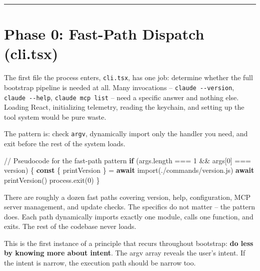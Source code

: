 \documentclass[
  english,
  11pt,
  letterpaper,
]{book}
\newenvironment{Shaded}{\begin{snugshade}}{\end{snugshade}}
\newcommand{\AttributeTok}[1]{\textcolor[rgb]{0.40,0.45,0.13}{#1}}
\newcommand{\BuiltInTok}[1]{\textcolor[rgb]{0.00,0.23,0.31}{#1}}
\newcommand{\CommentTok}[1]{\textcolor[rgb]{0.37,0.37,0.37}{#1}}
\newcommand{\ControlFlowTok}[1]{\textcolor[rgb]{0.00,0.23,0.31}{\textbf{#1}}}
\newcommand{\DecValTok}[1]{\textcolor[rgb]{0.68,0.00,0.00}{#1}}
\newcommand{\FunctionTok}[1]{\textcolor[rgb]{0.28,0.35,0.67}{#1}}
\newcommand{\ImportTok}[1]{\textcolor[rgb]{0.00,0.46,0.62}{#1}}
\newcommand{\KeywordTok}[1]{\textcolor[rgb]{0.00,0.23,0.31}{\textbf{#1}}}
\newcommand{\NormalTok}[1]{\textcolor[rgb]{0.00,0.23,0.31}{#1}}
\newcommand{\OperatorTok}[1]{\textcolor[rgb]{0.37,0.37,0.37}{#1}}
\newcommand{\StringTok}[1]{\textcolor[rgb]{0.13,0.47,0.30}{#1}}
\begin{document}
\begin{center}\rule{0.5\linewidth}{0.5pt}\end{center}

\section{Phase 0: Fast-Path Dispatch
(cli.tsx)}\label{phase-0-fast-path-dispatch-cli.tsx}

The first file the process enters, \texttt{cli.tsx}, has one job:
determine whether the full bootstrap pipeline is needed at all. Many
invocations -- \texttt{claude\ -\/-version}, \texttt{claude\ -\/-help},
\texttt{claude\ mcp\ list} -- need a specific answer and nothing else.
Loading React, initializing telemetry, reading the keychain, and setting
up the tool system would be pure waste.

The pattern is: check \texttt{argv}, dynamically import only the handler
you need, and exit before the rest of the system loads.

\begin{Shaded}
\begin{Highlighting}[]
\CommentTok{// Pseudocode for the fast{-}path pattern}
\ControlFlowTok{if}\NormalTok{ (args}\OperatorTok{.}\AttributeTok{length} \OperatorTok{===} \DecValTok{1} \OperatorTok{\&\&}\NormalTok{ args[}\DecValTok{0}\NormalTok{] }\OperatorTok{===} \StringTok{\textquotesingle{}{-}{-}version\textquotesingle{}}\NormalTok{) \{}
  \KeywordTok{const}\NormalTok{ \{ printVersion \} }\OperatorTok{=} \ControlFlowTok{await} \ImportTok{import}\NormalTok{(}\StringTok{\textquotesingle{}./commands/version.js\textquotesingle{}}\NormalTok{)}
  \ControlFlowTok{await} \FunctionTok{printVersion}\NormalTok{()}
  \BuiltInTok{process}\OperatorTok{.}\FunctionTok{exit}\NormalTok{(}\DecValTok{0}\NormalTok{)}
\NormalTok{\}}
\end{Highlighting}
\end{Shaded}

There are roughly a dozen fast paths covering version, help,
configuration, MCP server management, and update checks. The specifics
do not matter -- the pattern does. Each path dynamically imports exactly
one module, calls one function, and exits. The rest of the codebase
never loads.

This is the first instance of a principle that recurs throughout
bootstrap: \textbf{do less by knowing more about intent}. The argv array
reveals the user's intent. If the intent is narrow, the execution path
should be narrow too.
\end{document}
